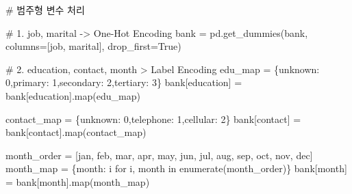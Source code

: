 \documentclass[
  a4paper,
  DIV=11,
  numbers=noendperiod]{scrreprt}
\newenvironment{Shaded}{\begin{snugshade}}{\end{snugshade}}
\newcommand{\BuiltInTok}[1]{\textcolor[rgb]{0.00,0.23,0.31}{#1}}
\newcommand{\CommentTok}[1]{\textcolor[rgb]{0.37,0.37,0.37}{#1}}
\newcommand{\ControlFlowTok}[1]{\textcolor[rgb]{0.00,0.23,0.31}{#1}}
\newcommand{\DecValTok}[1]{\textcolor[rgb]{0.68,0.00,0.00}{#1}}
\newcommand{\KeywordTok}[1]{\textcolor[rgb]{0.00,0.23,0.31}{#1}}
\newcommand{\NormalTok}[1]{\textcolor[rgb]{0.00,0.23,0.31}{#1}}
\newcommand{\OperatorTok}[1]{\textcolor[rgb]{0.37,0.37,0.37}{#1}}
\newcommand{\StringTok}[1]{\textcolor[rgb]{0.13,0.47,0.30}{#1}}
\newcommand{\VariableTok}[1]{\textcolor[rgb]{0.07,0.07,0.07}{#1}}
\begin{document}
\begin{Shaded}
\begin{Highlighting}[]
\CommentTok{\# 범주형 변수 처리}

\CommentTok{\# 1. job, marital {-}\textgreater{} One{-}Hot Encoding}
\NormalTok{bank }\OperatorTok{=}\NormalTok{ pd.get\_dummies(bank, columns}\OperatorTok{=}\NormalTok{[}\StringTok{\textquotesingle{}job\textquotesingle{}}\NormalTok{, }\StringTok{\textquotesingle{}marital\textquotesingle{}}\NormalTok{], drop\_first}\OperatorTok{=}\VariableTok{True}\NormalTok{)}

\CommentTok{\# 2. education, contact, month \textgreater{} Label Encoding}
\NormalTok{edu\_map }\OperatorTok{=}\NormalTok{ \{}\StringTok{\textquotesingle{}unknown\textquotesingle{}}\NormalTok{: }\DecValTok{0}\NormalTok{,}\StringTok{\textquotesingle{}primary\textquotesingle{}}\NormalTok{: }\DecValTok{1}\NormalTok{,}\StringTok{\textquotesingle{}secondary\textquotesingle{}}\NormalTok{: }\DecValTok{2}\NormalTok{,}\StringTok{\textquotesingle{}tertiary\textquotesingle{}}\NormalTok{: }\DecValTok{3}\NormalTok{\}}
\NormalTok{bank[}\StringTok{\textquotesingle{}education\textquotesingle{}}\NormalTok{] }\OperatorTok{=}\NormalTok{ bank[}\StringTok{\textquotesingle{}education\textquotesingle{}}\NormalTok{].}\BuiltInTok{map}\NormalTok{(edu\_map)}

\NormalTok{contact\_map }\OperatorTok{=}\NormalTok{ \{}\StringTok{\textquotesingle{}unknown\textquotesingle{}}\NormalTok{: }\DecValTok{0}\NormalTok{,}\StringTok{\textquotesingle{}telephone\textquotesingle{}}\NormalTok{: }\DecValTok{1}\NormalTok{,}\StringTok{\textquotesingle{}cellular\textquotesingle{}}\NormalTok{: }\DecValTok{2}\NormalTok{\}}
\NormalTok{bank[}\StringTok{\textquotesingle{}contact\textquotesingle{}}\NormalTok{] }\OperatorTok{=}\NormalTok{ bank[}\StringTok{\textquotesingle{}contact\textquotesingle{}}\NormalTok{].}\BuiltInTok{map}\NormalTok{(contact\_map)}

\NormalTok{month\_order }\OperatorTok{=}\NormalTok{ [}\StringTok{\textquotesingle{}jan\textquotesingle{}}\NormalTok{, }\StringTok{\textquotesingle{}feb\textquotesingle{}}\NormalTok{, }\StringTok{\textquotesingle{}mar\textquotesingle{}}\NormalTok{, }\StringTok{\textquotesingle{}apr\textquotesingle{}}\NormalTok{, }\StringTok{\textquotesingle{}may\textquotesingle{}}\NormalTok{, }\StringTok{\textquotesingle{}jun\textquotesingle{}}\NormalTok{,}
               \StringTok{\textquotesingle{}jul\textquotesingle{}}\NormalTok{, }\StringTok{\textquotesingle{}aug\textquotesingle{}}\NormalTok{, }\StringTok{\textquotesingle{}sep\textquotesingle{}}\NormalTok{, }\StringTok{\textquotesingle{}oct\textquotesingle{}}\NormalTok{, }\StringTok{\textquotesingle{}nov\textquotesingle{}}\NormalTok{, }\StringTok{\textquotesingle{}dec\textquotesingle{}}\NormalTok{]}
\NormalTok{month\_map }\OperatorTok{=}\NormalTok{ \{month: i }\ControlFlowTok{for}\NormalTok{ i, month }\KeywordTok{in} \BuiltInTok{enumerate}\NormalTok{(month\_order)\}}
\NormalTok{bank[}\StringTok{\textquotesingle{}month\textquotesingle{}}\NormalTok{] }\OperatorTok{=}\NormalTok{ bank[}\StringTok{\textquotesingle{}month\textquotesingle{}}\NormalTok{].}\BuiltInTok{map}\NormalTok{(month\_map)}


\end{Highlighting}
\end{Shaded}
\end{document}
